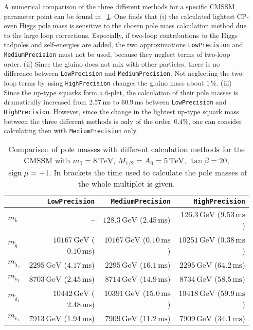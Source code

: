 \documentclass[final,3p,11pt,pdflatex]{elsarticle}
\newcommand{\code}[1]{\lstinline|#1|}  %
\newcommand{\unit}[1]{\,\text{#1}}      %
\newcommand{\tabref}[1]{\tablename~\ref{#1}}
\DeclareMathOperator{\sign}{sign}
\begin{document}
%
A numerical comparison of the three different methods for a specific
CMSSM parameter point can be found in
\tabref{tab:pole-mass-precision-comparison}.  One finds that (i) the
calculated lightest CP-even Higgs pole mass is sensitive to the chosen
pole mass calculation method due to the large loop corrections.
Especially, if two-loop contributions to the Higgs tadpoles and
self-energies are added, the two approximations \code{LowPrecision}
and \code{MediumPrecision} must not be used, because they neglect
terms of two-loop order.  (ii) Since the gluino does not mix with
other particles, there is no difference between \code{LowPrecision}
and \code{MediumPrecision}.  Not neglecting the two-loop terms by
using \code{HighPrecision} changes the gluino mass about $1\unit{\%}$.
(iii) Since the up-type squarks form a $6$-plet, the calculation of
their pole masses is dramatically increased from $2.57\unit{ms}$ to
$60.9\unit{ms}$ between \code{LowPrecision} and \code{HighPrecision}.
However, since the change in the lightest up-type squark mass between
the three different methods is only of the order $\unit{0.4\%}$, one
can consider calculating then with \code{MediumPrecision} only.
%
\begin{table}[tbh]
  \centering
  \begin{tabular}{lrrr}
    \toprule
    & \code{LowPrecision}
    & \code{MediumPrecision}
    & \code{HighPrecision}\\
    \midrule
    $m_h$
    & --
    & $128.3\unit{GeV}$ ($2.45\unit{ms}$)
    & $126.3\unit{GeV}$ ($9.53\unit{ms}$) \\
    $m_{\tilde{g}}$
    & $10167\unit{GeV}$ ($0.10\unit{ms}$)
    & $10167\unit{GeV}$ ($0.10\unit{ms}$)
    & $10251\unit{GeV}$ ($0.38\unit{ms}$) \\
    $m_{\tilde{\chi}_1}$
    & $2295\unit{GeV}$ ($4.17\unit{ms}$)
    & $2295\unit{GeV}$ ($16.1\unit{ms}$)
    & $2295\unit{GeV}$ ($64.2\unit{ms}$) \\
    $m_{\tilde{u}_1}$
    & $8703\unit{GeV}$ ($2.45\unit{ms}$)
    & $8714\unit{GeV}$ ($14.9\unit{ms}$)
    & $8734\unit{GeV}$ ($58.5\unit{ms}$) \\
    $m_{\tilde{d}_1}$
    & $10442\unit{GeV}$ ($2.48\unit{ms}$)
    & $10391\unit{GeV}$ ($15.0\unit{ms}$)
    & $10418\unit{GeV}$ ($59.9\unit{ms}$) \\
    $m_{\tilde{e}_1}$
    & $7913\unit{GeV}$ ($1.94\unit{ms}$)
    & $7909\unit{GeV}$ ($11.2\unit{ms}$)
    & $7909\unit{GeV}$ ($34.1\unit{ms}$) \\
    \bottomrule
  \end{tabular}
  \caption{Comparison of pole masses with different calculation
    methods for the CMSSM with $m_0=8\unit{TeV}$, $M_{1/2}=A_0=5\unit{TeV}$,
    $\tan\beta=20$, $\sign\mu=+1$.  In brackets the time used to calculate
    the pole masses of the whole multiplet is given.}
  \label{tab:pole-mass-precision-comparison}
\end{table}
%
\end{document}
